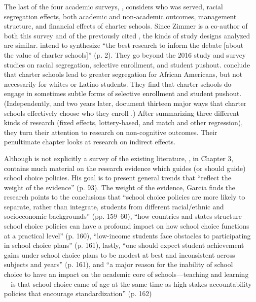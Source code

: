 The last of the four academic surveys, \textcite{Zimmer.etal2019}, considers who was served, racial segregation effects, both academic and non-academic outcomes, management structure, and financial effects of charter schools. Since Zimmer is a co-author of both this survey and of the previously cited \textcite{Epple.etal2016}, the kinds of study designs analyzed are similar. \citeauthor{Zimmer.etal2019} intend to synthesize ``the best research to inform the debate [about the value of charter schools]'' (p. 2). They go beyond the 2016 study and survey studies on racial segregation, selective enrollment, and student pushout. \citeauthor{Zimmer.etal2019} conclude that charter schools lead to greater segregation for African Americans, but not necessarily for whites or Latino students. They find that charter schools do engage in sometimes subtle forms of selective enrollment and student pushout. (Independently, and two years later, \citeauthor{Mommandi.Welner2021} document thirteen major ways that charter schools effectively choose who they enroll \parencite{Mommandi.Welner2021}.) After summarizing three different kinds of research (fixed effects, lottery-based, and match and other regression), they turn their attention to research on non-cognitive outcomes. Their penultimate chapter looks at research on indirect effects.  

Although \textcite{Garcia2018} is not explicitly a survey of the existing literature, \textcite{Garcia2018}, in Chapter 3, 
contains much material on the research evidence which guides (or should guide) school choice policies. His goal is to present general trends that ``reflect the weight of the evidence'' (p. 93). The weight of the evidence, Garcia finds the research points to the conclusions that ``school choice policies are more likely to separate, rather than integrate, students from different racial/ethnic and socioeconomic backgrounds'' (pp. 159–60), ``how countries and states structure school choice policies can have a profound impact on how school choice functions at a practical level'' (p. 160), ``low-income students face obstacles to participating in school choice plans'' (p. 161), lastly, ``one should expect student achievement gains under school choice plans to be modest at best and inconsistent across subjects and years'' (p. 161), and ``a major reason for the inability of school
choice to have an impact on the academic core of schools—teaching and learning—is that school choice came of age
at the same time as high-stakes accountability policies that encourage standardization'' (p. 162)

